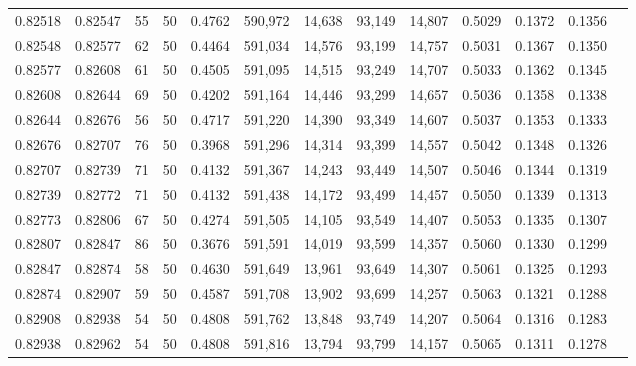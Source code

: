 \begin{tabular}{rrrrrrrrrrrrr}
0.82518 & 0.82547 &    55 &  50 &                                     0.4762 & 590,972 &  14,638 &  93,149 &  14,807 & 0.5029 & 0.1372 & 0.1356 \\
0.82548 & 0.82577 &    62 &  50 &                                     0.4464 & 591,034 &  14,576 &  93,199 &  14,757 & 0.5031 & 0.1367 & 0.1350 \\
0.82577 & 0.82608 &    61 &  50 &                                     0.4505 & 591,095 &  14,515 &  93,249 &  14,707 & 0.5033 & 0.1362 & 0.1345 \\
0.82608 & 0.82644 &    69 &  50 &                                     0.4202 & 591,164 &  14,446 &  93,299 &  14,657 & 0.5036 & 0.1358 & 0.1338 \\
0.82644 & 0.82676 &    56 &  50 &                                     0.4717 & 591,220 &  14,390 &  93,349 &  14,607 & 0.5037 & 0.1353 & 0.1333 \\
0.82676 & 0.82707 &    76 &  50 &                                     0.3968 & 591,296 &  14,314 &  93,399 &  14,557 & 0.5042 & 0.1348 & 0.1326 \\
0.82707 & 0.82739 &    71 &  50 &                                     0.4132 & 591,367 &  14,243 &  93,449 &  14,507 & 0.5046 & 0.1344 & 0.1319 \\
0.82739 & 0.82772 &    71 &  50 &                                     0.4132 & 591,438 &  14,172 &  93,499 &  14,457 & 0.5050 & 0.1339 & 0.1313 \\
0.82773 & 0.82806 &    67 &  50 &                                     0.4274 & 591,505 &  14,105 &  93,549 &  14,407 & 0.5053 & 0.1335 & 0.1307 \\
0.82807 & 0.82847 &    86 &  50 &                                     0.3676 & 591,591 &  14,019 &  93,599 &  14,357 & 0.5060 & 0.1330 & 0.1299 \\
0.82847 & 0.82874 &    58 &  50 &                                     0.4630 & 591,649 &  13,961 &  93,649 &  14,307 & 0.5061 & 0.1325 & 0.1293 \\
0.82874 & 0.82907 &    59 &  50 &                                     0.4587 & 591,708 &  13,902 &  93,699 &  14,257 & 0.5063 & 0.1321 & 0.1288 \\
0.82908 & 0.82938 &    54 &  50 &                                     0.4808 & 591,762 &  13,848 &  93,749 &  14,207 & 0.5064 & 0.1316 & 0.1283 \\
0.82938 & 0.82962 &    54 &  50 &                                     0.4808 & 591,816 &  13,794 &  93,799 &  14,157 & 0.5065 & 0.1311 & 0.1278 \\

\end{tabular}
